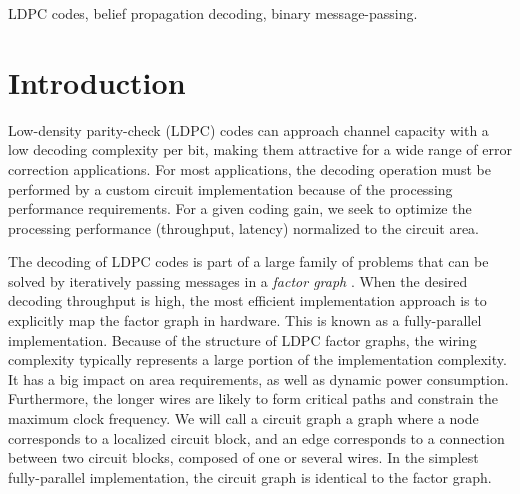 \documentclass[12pt,journal,twoside,draftcls,onecolumn]{IEEEtran}
\begin{document}
\begin{IEEEkeywords}
LDPC codes, belief propagation decoding, binary message-passing.
\end{IEEEkeywords}


\section{Introduction}
\label{sect_intro}

Low-density parity-check (LDPC) codes can approach channel capacity with a low decoding complexity per bit, making them attractive for a wide range of error correction applications. 
For most applications, the decoding operation must be performed by a custom circuit implementation because of the processing performance requirements. For a given coding gain, we seek to optimize the processing performance (throughput, latency) normalized to the circuit area.

The decoding of LDPC codes is part of a large family of problems that can be solved by iteratively passing messages in a \emph{factor graph} \cite{kschischang:2001}. When the desired decoding throughput is high, the most efficient implementation approach is to explicitly map the factor graph in hardware. This is known as a fully-parallel implementation. 
Because of the structure of LDPC factor graphs, the wiring complexity typically represents a large portion of the implementation complexity. It has a big impact on area requirements, as well as dynamic power consumption. Furthermore, the longer wires are likely to form critical paths and constrain the maximum clock frequency.
We will call a circuit graph a graph where a node corresponds to a localized circuit block, and an edge corresponds to a connection between two circuit blocks, composed of one or several wires. In the simplest fully-parallel implementation, the circuit graph is identical to the factor graph.
\end{document}
